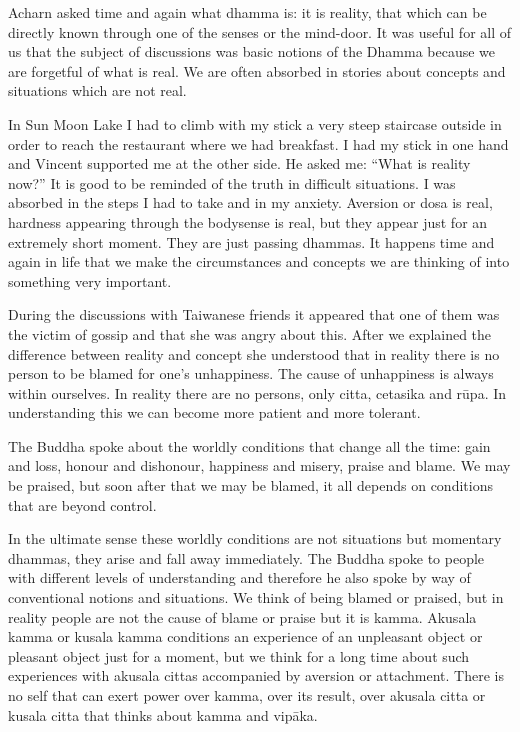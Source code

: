 \documentclass{book}
\begin{document}
Acharn asked time and again what dhamma is: it is reality,
that which can be directly known through one of the senses or the
mind-door. It was useful for all of us that the subject of discussions
was basic notions of the Dhamma because we are forgetful of what is
real. We are often absorbed in stories about concepts and situations
which are not real. 

In Sun Moon Lake I had to climb with my stick a very steep
staircase outside in order to reach the restaurant where we had
breakfast. I had my stick in one hand and Vincent supported me at the
other side. He asked me: ``What is reality now?'' It is good to be
reminded of the truth in difficult situations. I was absorbed in the
steps I had to take and in my anxiety. Aversion or dosa is real,
hardness appearing through the bodysense is real, but they appear just
for an extremely short moment. They are just passing dhammas. It happens
time and again in life that we make the circumstances and concepts we
are thinking of into something very important. 

During the discussions with Taiwanese friends it appeared
that one of them was the victim of gossip and that she was angry about
this. After we explained the difference between reality and concept she
understood that in reality there is no person to be blamed for one's
unhappiness. The cause of unhappiness is always within ourselves. In
reality there are no persons, only citta, cetasika and rūpa. In
understanding this we can become more patient and more tolerant. 

The Buddha spoke about the worldly conditions that change all
the time: gain and loss, honour and dishonour, happiness and misery,
praise and blame. We may be praised, but soon after that we may be
blamed, it all depends on conditions that are beyond control. 

In the ultimate sense these worldly conditions are not
situations but momentary dhammas, they arise and fall away immediately.
The Buddha spoke to people with different levels of understanding and
therefore he also spoke by way of conventional notions and situations.
We think of being blamed or praised, but in reality people are not the
cause of blame or praise but it is kamma. Akusala kamma or kusala kamma
conditions an experience of an unpleasant object or pleasant object just
for a moment, but we think for a long time about such experiences with
akusala cittas accompanied by aversion or attachment. There is no self
that can exert power over kamma, over its result, over akusala citta or
kusala citta that thinks about kamma and vipāka.
\end{document}
